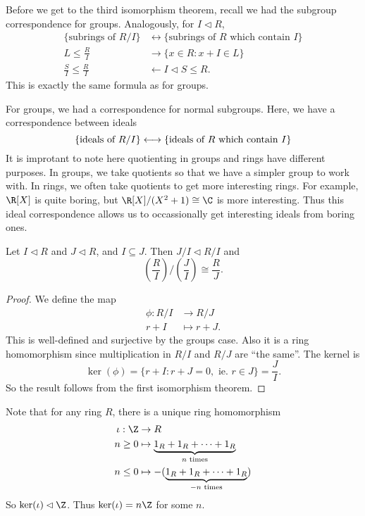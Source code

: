 \documentclass[a4paper]{article}
\begin{document}
Before we get to the third isomorphism theorem, recall we had the subgroup correspondence for groups. Analogously, for $I \lhd R$,
\begin{align*}
  \{\text{subrings of }R/I\} &\longleftrightarrow\{\text{subrings of }R\text{ which contain }I\}\\
  L \leq \frac{R}{I} &\longrightarrow \{x \in R: x + I \in L\}\\
  \frac{S}{I} \leq \frac{R}{I} &\longleftarrow I \lhd S \leq R.
\end{align*}
This is exactly the same formula as for groups.

For groups, we had a correspondence for normal subgroups. Here, we have a correspondence between ideals
\[
  \{\text{ideals of }R/I\} \longleftrightarrow\{\text{ideals of }R\text{ which contain }I\}\\
\]
It is improtant to note here quotienting in groups and rings have different purposes. In groups, we take quotients so that we have a simpler group to work with. In rings, we often take quotients to get more interesting rings. For example, $\R[X]$ is quite boring, but $\R[X]/(X^2 + 1) \cong \C$ is more interesting. Thus this ideal correspondence allows us to occassionally get interesting ideals from boring ones.

\begin{thm}
  Let $I \lhd R$ and $J \lhd R$, and $I \subseteq J$. Then $J / I \lhd R/I$ and
  \[
    \left(\frac{R}{I}\right) \big/ \left(\frac{J}{I}\right) \cong \frac{R}{J}.
  \]
\end{thm}

\begin{proof}
  We define the map
  \begin{align*}
    \phi: R/I &\to R/J\\
    r + I &\mapsto r + J.
  \end{align*}
  This is well-defined and surjective by the groups case. Also it is a ring homomorphism since multiplication in $R/I$ and $R/J$ are ``the same''. The kernel is
  \[
    \ker(\phi) = \{r + I: r + J = 0,\text{ ie. } r \in J\} = \frac{J}{I}.
  \]
  So the result follows from the first isomorphism theorem.
\end{proof}

Note that for any ring $R$, there is a unique ring homomorphism
\begin{align*}
  \iota: \Z &\to R\\
  n \geq 0 &\mapsto \underbrace{1_R + 1_R + \cdots + 1_R}_{n\text{ times}}\\
  n \leq 0 &\mapsto -(\underbrace{1_R + 1_R + \cdots + 1_R}_{-n\text{ times}})
\end{align*}
So $\ker(\iota) \lhd \Z$. Thus $\ker(\iota) = n\Z$ for some $n$.
\end{document}
